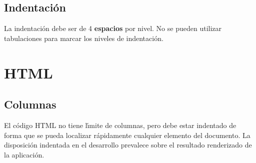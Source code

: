 \documentclass[a4paper, 10pt]{report}
\begin{document}
\section{Indentaci\'{o}n}
La indentaci\'{o}n debe ser de 4 {\bf espacios} por nivel. No se pueden utilizar tabulaciones para marcar los niveles de indentaci\'{o}n.

\chapter{HTML}

\section{Columnas}
El c\'{o}digo HTML no tiene l\'{\i}mite de columnas, pero debe estar indentado de forma que se pueda localizar r\'{a}pidamente cualquier elemento del documento. La disposici\'{o}n indentada en el desarrollo prevalece sobre el resultado renderizado de la aplicaci\'{o}n.
\end{document}
